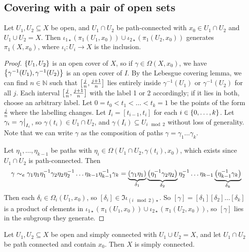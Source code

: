 \subsection{Covering with a pair of open sets}
\begin{theorem}
	Let \( U_1, U_2 \subseteq X \) be open, and \( U_1 \cap U_2 \) be path-connected with \( x_0 \in U_1 \cap U_2 \) and \( U_1 \cup U_2 = X \).
	Then \( \iota_{1\star}(\pi_1(U_1,x_0)) \cup \iota_{2\star}(\pi_1(U_2,x_0)) \) generates \( \pi_1(X,x_0) \), where \( \iota_i \colon U_i \to X \) is the inclusion.
\end{theorem}
\begin{proof}
	\( \qty{U_1, U_2} \) is an open cover of \( X \), so if \( \gamma \in \Omega(X,x_0) \), we have \( \qty{\gamma^{-1}(U_1), \gamma^{-1}(U_2)} \) is an open cover of \( I \).
	By the Lebesgue covering lemma, we can find \( n \in \mathbb N \) such that \( \qty[\frac{j}{n}, \frac{j+1}{n}] \) lies entirely inside \( \gamma^{-1}(U_1) \) or \( \gamma^{-1}(U_2) \) for all \( j \).
	Each interval \( \qty[\frac{j}{n}, \frac{j+1}{n}] \) with the label 1 or 2 accordingly; if it lies in both, choose an arbitrary label.
	Let \( 0 = t_0 < t_1 < \dots < t_k = 1 \) be the points of the form \( \frac{j}{n} \) where the labelling changes.
	Let \( I_i = [t_{i-1}, t_i] \) for each \( i \in \qty{0, \dots, k} \).
	Let \( \gamma_i = \eval{\gamma}_{I_i} \), so \( \gamma(t_i) \in U_1 \cap U_2 \), and \( \gamma(I_i) \subseteq U_{i \mod 2} \) without loss of generality.
	Note that we can write \( \gamma \) as the composition of paths \( \gamma = \gamma_1 \dots \gamma_k \).

	Let \( \eta_1, \dots, \eta_{k-1} \) be paths with \( \eta_i \in \Omega(U_1 \cap U_2, \gamma(t_i), x_0) \), which exists since \( U_1 \cap U_2 \) is path-connected.
	Then
	\[ \gamma \sim_e \gamma_1 \eta_1 \eta_1^{-1} \gamma_2 \eta_2 \eta_2^{-1} \dots \eta_{k-1} \eta_{k-1}^{-1} \gamma_k = \underbrace{\qty(\gamma_1 \eta_1)}_{\delta_1} \underbrace{\qty(\eta_1^{-1} \gamma_2 \eta_2)}_{\delta_2} \eta_2^{-1} \dots \eta_{k-1} \underbrace{\qty(\eta_{k-1}^{-1} \gamma_k)}_{\delta_k} \]
	Then each \( \delta_i \in \Omega_i(U_1, x_0) \), so \( [\delta_i] \in \Im \iota_{(i \mod 2)\star} \).
	So \( [\gamma] = [\delta_1][\delta_2]\dots[\delta_k] \) is a product of elements in \( \iota_{1\star}(\pi_1(U_1,x_0)) \cup \iota_{2\star}(\pi_1(U_2,x_0)) \), so \( [\gamma] \) lies in the subgroup they generate.
\end{proof}
\begin{corollary}
	Let \( U_1, U_2 \subseteq X \) be open and simply connected with \( U_1 \cup U_2 = X \), and let \( U_1 \cap U_2 \) be path connected and contain \( x_0 \).
	Then \( X \) is simply connected.
\end{corollary}
